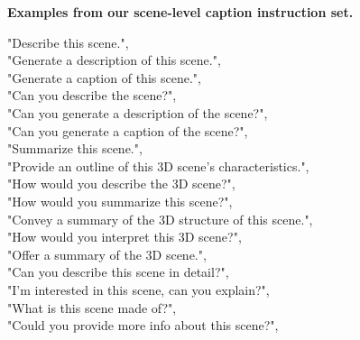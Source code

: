 \begin{table}[t!]
\caption{\textbf{Examples from our scene-level caption instruction set.}}
\vspace{-4pt}
\begin{tcolorbox}
\begin{minipage}{\linewidth}
    "Describe this scene.",\\
    "Generate a description of this scene.",\\
    "Generate a caption of this scene.",\\
    "Can you describe the scene?",\\
    "Can you generate a description of the scene?",\\
    "Can you generate a caption of the scene?",\\
    "Summarize this scene.",\\
    "Provide an outline of this 3D scene's characteristics.",\\
    "How would you describe the 3D scene?",\\
    "How would you summarize this scene?",\\
    "Convey a summary of the 3D structure of this scene.",\\
    "How would you interpret this 3D scene?",\\
    "Offer a summary of the 3D scene.",\\
    "Can you describe this scene in detail?",\\
    "I'm interested in this scene, can you explain?",\\
    "What is this scene made of?",\\
    "Could you provide more info about this scene?",
\end{minipage}
\end{tcolorbox}

\label{tab:scene-level_cap}
\end{table}

